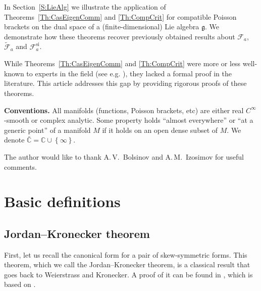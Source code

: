 \documentclass[12pt]{article}
\theoremstyle{definition}
\begin{document}
In Section~\ref{S:LieAlg}  we illustrate the application of Theorems~\ref{Th:CasEigenComm} and \ref{Th:CompCrit} for  compatible Poisson brackets on the dual space of a (finite-dimensional) Lie algebra $\mathfrak{g}$. We demonstrate how these theorems recover previously obtained results about $\mathcal{F}_a$, $\tilde{\mathcal{F}}_a$ and $\mathcal{F}_{a}^{\textrm{si}}$.

While Theorems~\ref{Th:CasEigenComm} and \ref{Th:CompCrit} were more or less well-known to experts in the field (see e.g. \cite[Proposition 2.1]{Izosimov14}), they lacked a formal proof in the literature. This article addresses this gap by providing rigorous proofs of these theorems.


\textbf{Conventions.} All manifolds (functions, Poisson brackets, etc)  are  either real $C^{\infty}$-smooth or complex analytic. Some property holds ``almost everywhere'' or ``at a generic point'' of a manifold $M$ if it holds on an open dense subset of $M$.  We denote $\bar{\mathbb{C}} = \mathbb{C} \cup \left\{ \infty \right\}$. 

\par\medskip

 
The author would like to thank A.\,V.~Bolsinov and A.\,M.~Izosimov for useful comments. 

\section{Basic definitions}

\subsection{Jordan--Kronecker theorem} 

First, let us recall the canonical form for a pair of skew-symmetric forms. This theorem, which we call the Jordan--Kronecker theorem, is a classical result that goes back to Weierstrass and Kronecker.  A proof of it can be found in \cite{Thompson}, which is based on \cite{Gantmaher88}.
\end{document}
